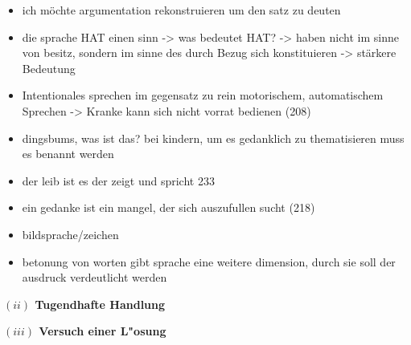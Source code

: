 \documentclass[a4paper, 12pt]{article}
\begin{document}
\begin{onehalfspace}
\begin{itemize}
  \item ich möchte argumentation rekonstruieren um den satz zu deuten
  \item die sprache HAT einen sinn -> was bedeutet HAT? -> haben nicht im sinne von besitz, sondern im sinne des durch Bezug sich konstituieren -> stärkere Bedeutung 
  \item Intentionales sprechen im gegensatz zu rein motorischem, automatischem Sprechen -> Kranke kann sich nicht vorrat bedienen (208)
  \item dingsbums, was ist das? bei kindern, um es gedanklich zu thematisieren muss es benannt werden
  \item der leib ist es der zeigt und spricht 233
  \item ein gedanke ist ein mangel, der sich auszufullen sucht (218)
  \item bildsprache/zeichen 
  \item betonung von worten gibt sprache eine weitere dimension, durch sie soll der ausdruck verdeutlicht werden
\end{itemize}


\vspace{5mm}
\noindent\textbf{$(ii)$ Tugendhafte Handlung}	

\noindent 


\vspace{5mm}
\noindent\textbf{$(iii)$ Versuch einer L"osung}	

\noindent 


\vspace{5mm}

\vspace{3mm}

\end{onehalfspace}
\nocite{*}
%
\printbibliography
\end{document}
